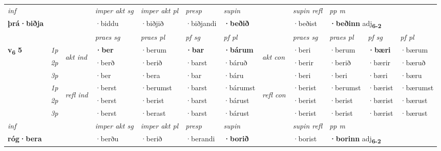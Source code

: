 \begin{longtable}[l]{X>{\footnotesize\itshape}llXXXXlXXXX}
   {\textit{inf}} & &  & \textit{imper akt sg} & \textit{imper akt pl}   & \textit{presp} & \textit{supin} && \textit{supin refl} & \textit{pp m} \\*
  {\textbf{þrá\allowbreak ·biðja}} & && ·biddu  & ·biðjið   & ·biðjandi &  \textbf{·beðið} && ·beðist & \multicolumn{2}{l}{\textbf{·beðinn} adj\textbf{\textsubscript{6-2}}} \\*

\midrule

 & &   & \textit{praes sg}  & \textit{praes pl}    & \textit{ pf sg} & \textit{pf pl} & & \textit{praes sg}  & \textit{praes pl}    & \textit{pf sg} & \textit{pf pl }  \\ \cmidrule{4-7} \cmidrule{9-12}
 \multirow{2}{*}{{{\textbf{v{\textsubscript{6}}} \Large{\textbf{5}}}}}  & 1p & \multirow{3}{*}{\begin{turn}{90}\textit{akt ind}\end{turn}} & \textbf{·ber} & ·berum & \textbf{·bar} & \textbf{·bárum} & \multirow{3}{*}{\begin{turn}{90}\textit{akt con}\end{turn}} &·beri & ·berum & \textbf{·bæri} & ·bærum\\*
 & 2p &  &  ·berð  & ·berið & ·barst & ·báruð & & ·berir & ·berið & ·bærir & ·bæruð \\*
 & 3p &  & ·ber & ·bera & ·bar & ·báru & & ·beri & ·beri& ·bæri & ·bæru \\*
\cmidrule{4-7} \cmidrule{9-12}
 & 1p & \multirow{3}{*}{\begin{turn}{90}\textit{refl ind}\end{turn}}  & ·berst & ·berumst & ·barst & ·bárumst & \multirow{3}{*}{\begin{turn}{90}\textit{refl con}\end{turn}}  &·berist & ·berumst & ·bærist & ·bærumst \\*
 & 2p &  & ·berst & ·berist & ·barst & ·bárust & &·berist & ·berist & ·bærist & ·bærust \\*
 & 3p  & & ·berst & ·berast & ·barst & ·bárust & & ·berist & ·berist& ·bærist & ·bærust \\*
\cmidrule{4-7} \cmidrule{9-12}

   {\textit{inf}} & &  & \textit{imper akt sg} & \textit{imper akt pl}   & \textit{presp} & \textit{supin} && \textit{supin refl} & \textit{pp m} \\*
  {\textbf{róg\allowbreak ·bera}} & && ·berðu  & ·berið   & ·berandi &  \textbf{·borið} && ·borist & \multicolumn{2}{l}{\textbf{·borinn} adj\textbf{\textsubscript{6-2}}} \\*


\end{longtable}
